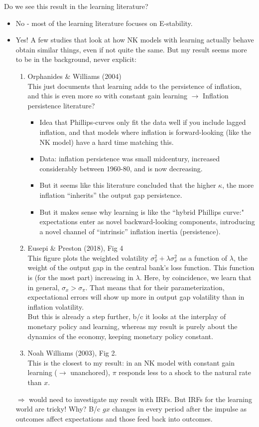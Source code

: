 \documentclass[11pt]{article}
\renewcommand{\[}{\begin{equation}}
\renewcommand{\]}{\end{equation}}
\begin{document}
	 Do we see this result in the learning literature?
		\begin{itemize}
		\item No - most of the learning literature focuses on E-stability.
		\item Yes! A few studies that look at how NK models with learning actually behave obtain similar things, even if not quite the same. But my result seems more to be in the background, never explicit:
			\begin{enumerate}
			\item Orphanides \& Williams (2004) \\
			This just documents that learning adds to the persistence of inflation, and this is even more so with constant gain learning $\rightarrow$
			Inflation persistence literature?
			\begin{itemize}
			\item Idea that Phillips-curves only fit the data well if you include lagged inflation, and that models where inflation is forward-looking (like the NK model) have a hard time matching this.
			\item Data: inflation persistence was small midcentury, increased considerably between 1960-80, and is now decreasing. 
			\item But it seems like this literature concluded that the higher $\kappa$, the more inflation ``inherits'' the output gap persistence. 
			\item But it makes sense why learning is like the ``hybrid Phillips curve:" expectations enter as novel backward-looking components, introducing a novel channel of ``intrinsic'' inflation inertia (persistence).
			\end{itemize}

			\item Eusepi \& Preston (2018), Fig 4 \\
			This figure plots the weighted volatility $\sigma_{\pi}^2 + \lambda \sigma_x^2$ as a function of $\lambda$, the weight of the output gap in the central bank's loss function. This function is (for the most part) increasing in $\lambda$. Here, by coincidence, we learn that in general, $\sigma_x > \sigma_{\pi}$. That means that for their parameterization, expectational errors will show up more in output gap volatility than in inflation volatility. \\ 
			But this is already a step further, b/c it looks at the interplay of monetary policy and learning, whereas my result is purely about the dynamics of the economy, keeping monetary policy constant.
			\item Noah Williams (2003), Fig 2. \\
			This is the closest to my result: in an NK model with constant gain learning ($\rightarrow$ unanchored), $\pi$ responds less to a shock to the natural rate than $x$. 
			\end{enumerate}
			$\Rightarrow$ would need to investigate my result with IRFs. But IRFs for the learning world are tricky! Why? B/c $gx$ changes in every period after the impulse as outcomes affect expectations and those feed back into outcomes. 
		\end{itemize}
\end{document}
